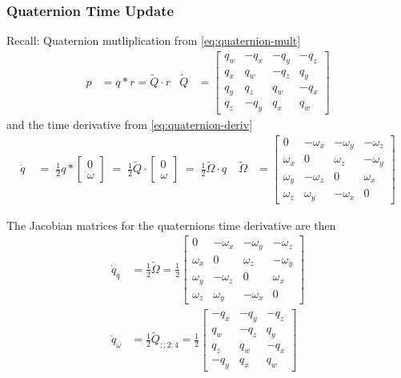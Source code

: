 \subsubsection{Quaternion Time Update}
Recall: Quaternion mutliplication from \autoref{eq:quaternion-mult}
\begin{align}
    p &= q * r = \tilde Q \cdot r &
    \tilde Q &= \begin{bmatrix}
        q_w & -q_x & -q_y & -q_z \\
        q_x & q_w & -q_z & q_y \\
        q_y & q_z & q_w & -q_x \\
        q_z & -q_y & q_x & q_w
    \end{bmatrix} 
\end{align}
and the time derivative from \autoref{eq:quaternion-deriv}
\begin{align}
    \dot q \;
    &= \; \frac{1}{2} q * \begin{bmatrix}
        0 \\ \omega
    \end{bmatrix} \;
    = \; \frac{1}{2} \tilde Q \cdot \begin{bmatrix}
        0 \\ \omega
    \end{bmatrix} \;
    = \; \frac{1}{2} \tilde \Omega \cdot q \;
    & 
    \tilde \Omega &= \begin{bmatrix}
        0 & -\omega_x & -\omega_y & -\omega_z \\
        \omega_x & 0 & \omega_z & -\omega_y \\
        \omega_y & -\omega_z & 0 & \omega_x \\
        \omega_z & \omega_y & -\omega_x & 0
    \end{bmatrix}    
\end{align}

The Jacobian matrices for the quaternions time derivative are then
\begin{align}
    \dot q_q &= \frac{1}{2} \tilde \Omega = \frac{1}{2} \begin{bmatrix}
        0 & -\omega_x & -\omega_y & -\omega_z \\
        \omega_x & 0 & \omega_z & -\omega_y \\
        \omega_y & -\omega_z & 0 & \omega_x \\
        \omega_z & \omega_y & -\omega_x & 0
    \end{bmatrix}    
    \\
    \dot q_\omega &= \frac{1}{2} \tilde Q_{:, 2:4} = \frac{1}{2} \begin{bmatrix}
        -q_x & -q_y & -q_z \\
        q_w & -q_z & q_y \\
        q_z & q_w & -q_x \\
        -q_y & q_x & q_w
    \end{bmatrix} 
\end{align}

